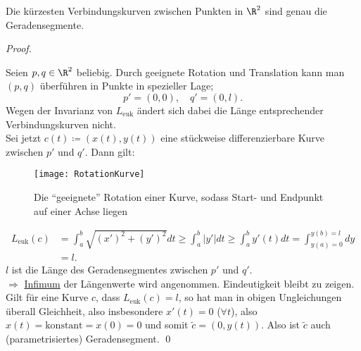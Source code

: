 \begin{lemma}\label{lemma:geradenkurz}
  Die kürzesten Verbindungskurven zwischen Punkten in \( \R^2 \) sind genau die Geradensegmente. \\
  \begin{proof}
    \  \\
    \begin{minipage}{.45\textwidth}
      Seien \( p, q \in \R^2 \) beliebig. Durch geeignete Rotation und Translation kann man \( (p,q) \) überführen in Punkte in spezieller Lage;
      \begin{equation*}
        p' = (0,0), \quad q' = (0,l)\text{.}
      \end{equation*}
      Wegen der Invarianz von \( L_\text{euk} \) ändert sich dabei die Länge entsprechender Verbindungskurven nicht. \\
      Sei jetzt \( c(t) \coloneqq (x(t),y(t)) \) eine stückweise differenzierbare Kurve zwischen \( p' \) und \( q' \). Dann gilt:
    \end{minipage}
    \hfill
    \begin{minipage}{.45\textwidth}
      \begin{figure}[H]
        \texttt{[image: RotationKurve]}
        \caption{Die ``geeignete'' Rotation einer Kurve, sodass Start- und Endpunkt auf einer Achse liegen}
      \end{figure}
    \end{minipage}
    \begin{align*}
      L_\text{euk}(c) &= \int_a^b\sqrt{{(x')}^2+{(y')}^2}dt \geq \int_a^b\vert y' \vert dt \geq \int_a^b y'(t)dt = \int_{y(a) = 0}^{y(b) = l} dy \\
       &= l\text{.}
    \end{align*}
    \( l \) ist die Länge des Geradensegmentes zwischen \( p' \) und \( q' \). \\
    \( \Rightarrow \) \underline{Infimum} der Längenwerte wird angenommen. Eindeutigkeit bleibt zu zeigen. \\
    Gilt für eine Kurve \( c \), dass \( L_\text{euk}(c) = l \), so hat man in obigen Ungleichungen überall Gleichheit, also insbesondere \( x'(t) = 0 \) (\( \forall t \)), also \( x(t) = \text{konstant} = x(0) = 0 \) und somit \( \widetilde{c} = (0,y(t)) \). Also ist \( \widetilde{c} \) auch (parametrisiertes) Geradensegment. \qed{}
  \end{proof}
\end{lemma}

